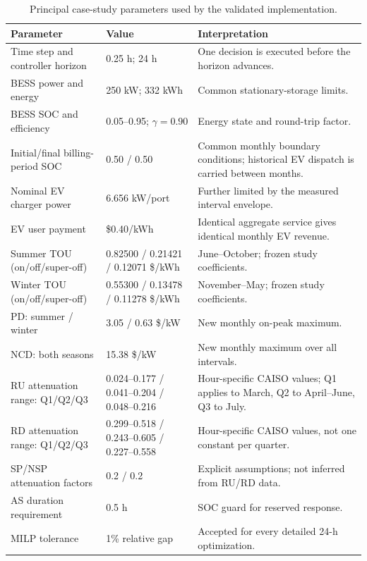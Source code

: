 \documentclass[final,5p,times]{elsarticle}
\begin{document}
\begin{table}[!t]
\centering
\caption{Principal case-study parameters used by the validated implementation.}
\label{tab:case_parameters}
\small
\begin{tabularx}{\textwidth}{@{}p{}p{}X@{}}
\toprule
Parameter & Value & Interpretation \\
\midrule
Time step and controller horizon & 0.25 h; 24 h & One decision is executed before the horizon advances. \\
BESS power and energy & 250 kW; 332 kWh & Common stationary-storage limits. \\
BESS SOC and efficiency & 0.05--0.95; $\gamma=0.90$ & Energy state and round-trip factor. \\
Initial/final billing-period SOC & 0.50 / 0.50 & Common monthly boundary conditions; historical EV dispatch is carried between months. \\
Nominal EV charger power & 6.656 kW/port & Further limited by the measured interval envelope. \\
EV user payment & \$0.40/kWh & Identical aggregate service gives identical monthly EV revenue. \\
Summer TOU (on/off/super-off) & 0.82500 / 0.21421 / 0.12071 \$/kWh & June--October; frozen study coefficients. \\
Winter TOU (on/off/super-off) & 0.55300 / 0.13478 / 0.11278 \$/kWh & November--May; frozen study coefficients. \\
PD: summer / winter & 3.05 / 0.63 \$/kW & New monthly on-peak maximum. \\
NCD: both seasons & 15.38 \$/kW & New monthly maximum over all intervals. \\
RU attenuation range: Q1/Q2/Q3 & 0.024--0.177 / 0.041--0.204 / 0.048--0.216 & Hour-specific CAISO values; Q1 applies to March, Q2 to April--June, Q3 to July. \\
RD attenuation range: Q1/Q2/Q3 & 0.299--0.518 / 0.243--0.605 / 0.227--0.558 & Hour-specific CAISO values, not one constant per quarter. \\
SP/NSP attenuation factors & 0.2 / 0.2 & Explicit assumptions; not inferred from RU/RD data. \\
AS duration requirement & 0.5 h & SOC guard for reserved response. \\
MILP tolerance & 1\% relative gap & Accepted for every detailed 24-h optimization. \\
\bottomrule
\end{tabularx}
\end{table}
\end{document}

